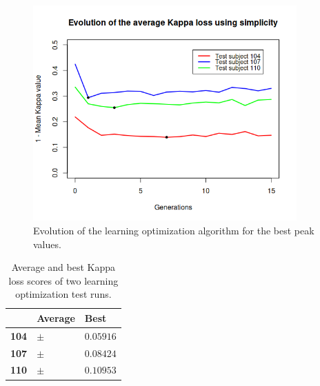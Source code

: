 	\begin{figure}[bth]

		\myfloatalign
		\includegraphics[width=0.9\textwidth]{gfx/SO_SimplicityEvolution.png} %
		\caption[Evolution of the learning optimization algorithm]{Evolution of the learning optimization algorithm for the best peak values.}\label{gfx:learning_evolution}

	\end{figure}

	\begin{table}[h]

        \centering
        \setlength\arrayrulewidth{0.8pt}

        \begin{tabular}{| >{\centering\arraybackslash}m{0.7in} | >{\centering\arraybackslash}m{1.1in} | >{\centering\arraybackslash}m{1.1in} |}

			\hline
			\rowcolor{RoyalBlue}
			 & \textbf{Average} & \textbf{Best} \\
            \hline
            \cellcolor{RoyalBlue}\textbf{104} & $ \pm $ & $0.05916$ \\
            \hline
            \cellcolor{RoyalBlue}\textbf{107} & $ \pm $ & $0.08424$ \\
            \hline
            \cellcolor{RoyalBlue}\textbf{110} & $ \pm $ & $0.10953$ \\
            \hline

        \end{tabular}

        \caption{Average and best Kappa loss scores of two learning optimization test runs.}\label{table:average_best_learning}

    \end{table}

